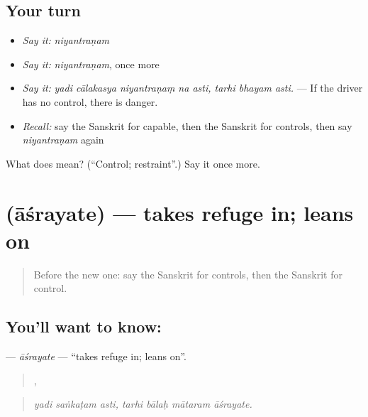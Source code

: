 \subsection*{Your turn}
\begin{itemize}
\raggedright
  \item \emph{Say it:} \emph{niyantraṇam}
  \item \emph{Say it:} \emph{niyantraṇam}, once more
  \item \emph{Say it:} \emph{yadi cālakasya niyantraṇaṃ na asti, tarhi bhayam asti.} — If the driver has no control, there is danger.
  \item \emph{Recall:} say the Sanskrit for capable, then the Sanskrit for controls, then say \emph{niyantraṇam} again
\end{itemize}

\begin{tcolorbox}[breakable,colback=teal!4,colframe=teal!35!black,title={Before you move on}]
What does  mean? (\textquotedblleft{}Control; restraint\textquotedblright{}.) Say it once more.
\end{tcolorbox}
\section[\texorpdfstring{\sk{आश्रयते} (āśrayate)}{आश्रयते (āśrayate)}]{ (āśrayate) — takes refuge in; leans on}

\label{lesson:SA-C376-asrayate}



\begin{quote}
Before the new one: say the Sanskrit for controls, then the Sanskrit for control.
\end{quote}

\subsection*{You'll want to know: }
\textbf{} — \emph{āśrayate} — \textquotedblleft{}takes refuge in; leans on\textquotedblright{}.

\begin{quote}
  ,    
\end{quote}

\begin{quote}
\emph{yadi saṅkaṭam asti, tarhi bālaḥ mātaram āśrayate.}
\end{quote}

